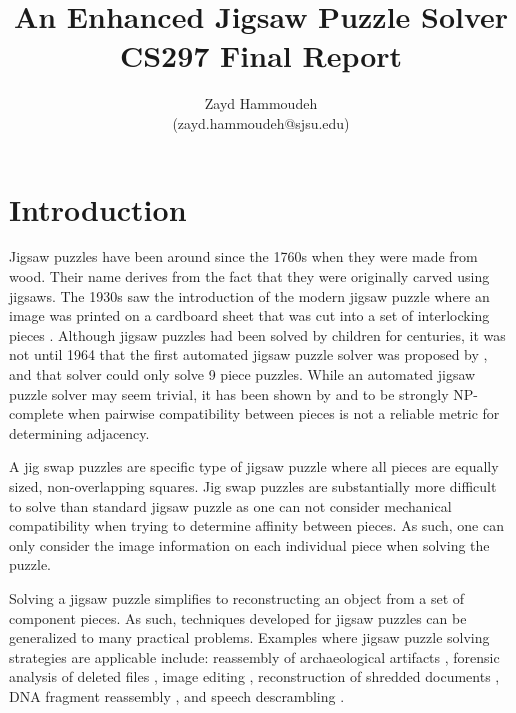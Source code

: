\documentclass{report}
\title{An Enhanced Jigsaw Puzzle Solver \\[1in]
	   CS297 Final Report}
\author{
  Zayd Hammoudeh \\
  (zayd.hammoudeh@sjsu.edu)
  }
\begin{document}
\maketitle


\tableofcontents{\protect\newpage}

\listoffigures
\newpage
 

\renewcommand\thesection{\arabic{section}}

\section{Introduction}\label{sec:introduction}

Jigsaw puzzles have been around since the 1760s when they were made from wood.  Their name derives from the fact that they were originally carved using jigsaws.   The 1930s saw the introduction of the modern jigsaw puzzle where an image was printed on a cardboard sheet that was cut into a set of interlocking pieces \cite{williams1990, williams2004}.  Although jigsaw puzzles had been solved by children for centuries, it was not until 1964 that the first automated jigsaw puzzle solver was proposed by \cite{freeman1964}, and that solver could only solve 9 piece puzzles.  While an automated jigsaw puzzle solver may seem trivial, it has been shown by \cite{altman1990} and \cite{demaine2007} to be strongly NP-complete when pairwise compatibility between pieces is not a reliable metric for determining adjacency.

A jig swap puzzles are specific type of jigsaw puzzle where  all pieces are equally sized, non-overlapping squares.  Jig swap puzzles are substantially more difficult to solve than standard jigsaw puzzle as one can not consider mechanical compatibility when trying to determine affinity between pieces.  As such, one can only consider the image information on each individual piece when solving the puzzle.  

Solving a jigsaw puzzle simplifies to reconstructing an object from a set of component pieces.  As such, techniques developed for jigsaw puzzles can be generalized to many practical problems.  Examples where jigsaw puzzle solving strategies are applicable include: reassembly of archaeological artifacts \cite{brown2008, koller2006}, forensic analysis of deleted files \cite{garfinkel2010}, image editing \cite{cho2008}, reconstruction of shredded documents \cite{zhu2008}, DNA fragment reassembly \cite{marande2007}, and speech descrambling \cite{zhao2007}.
\end{document}
